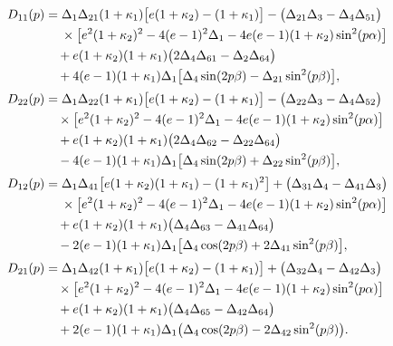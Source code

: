 \begin{subequations}
	\begin{align}
		D_{11}(p)
		&=\Delta_{1} \Delta_{21} (1+\kappa_{1})
		\bigl[e(1+\kappa_{2})-(1+\kappa_{1})\bigr]
		-\bigl(\Delta_{21}\Delta_{3}-\Delta_{4}\Delta_{51}\bigr)\notag\\
		&\quad\;\times
		\bigl[e^{2}(1+\kappa_{2})^{2}
		-4(e-1)^{2}\Delta_{1}
		-4e(e-1)(1+\kappa_{2})\sin^{2}(p\alpha)\bigr]
		\notag\\
		&\quad
		+e(1+\kappa_{2})(1+\kappa_{1})
		\bigl(2\Delta_{4}\Delta_{61}-\Delta_{2}\Delta_{64}\bigr)
		\notag\\
		&\quad
		+4(e-1)(1+\kappa_{1})\Delta_{1}
		\bigl[\Delta_{4}\sin(2p\beta)-\Delta_{21}\sin^{2}(p\beta)\bigr],
		\notag\\[2pt]
		D_{22}(p)
		&=\Delta_{1} \Delta_{22} (1+\kappa_{1})
		\bigl[e(1+\kappa_{2})-(1+\kappa_{1})\bigr]
		-\bigl(\Delta_{22}\Delta_{3}-\Delta_{4}\Delta_{52}\bigr)\notag\\
		&\quad\times
		\bigl[e^{2}(1+\kappa_{2})^{2}
		-4(e-1)^{2}\Delta_{1}
		-4e(e-1)(1+\kappa_{2})\sin^{2}(p\alpha)\bigr]
		\notag\\
		&\quad
		+e(1+\kappa_{2})(1+\kappa_{1})
		\bigl(2\Delta_{4}\Delta_{62}-\Delta_{22}\Delta_{64}\bigr)
		\notag\\
		&\quad
		-4(e-1)(1+\kappa_{1})\Delta_{1}
		\bigl[\Delta_{4}\sin(2p\beta)+\Delta_{22}\sin^{2}(p\beta)\bigr],
		\notag\\[2pt]
		D_{12}(p)
		&=\Delta_{1} \Delta_{41} 
		\bigl[e(1+\kappa_{2})(1+\kappa_{1})-(1+\kappa_{1})^{2}\bigr]
		+\bigl(\Delta_{31}\Delta_{4}-\Delta_{41}\Delta_{3}\bigr)\notag\\
		&\quad\;\times
		\bigl[e^{2}(1+\kappa_{2})^{2}
		-4(e-1)^{2}\Delta_{1}
		-4e(e-1)(1+\kappa_{2})\sin^{2}(p\alpha)\bigr]
		\notag\\
		&\quad
		+e(1+\kappa_{2})(1+\kappa_{1})
		\bigl(\Delta_{4}\Delta_{63}-\Delta_{41}\Delta_{64}\bigr)
		\notag\\
		&\quad
		-2(e-1)(1+\kappa_{1})\Delta_{1}
		\bigl[\Delta_{4}\cos(2p\beta)+2\Delta_{41}\sin^{2}(p\beta)\bigr],
		\notag\\[2pt]
		D_{21}(p)
		&=\Delta_{1} \Delta_{42} (1+\kappa_{1})
		\bigl[e(1+\kappa_{2})-(1+\kappa_{1})\bigr]
		+\bigl(\Delta_{32}\Delta_{4}-\Delta_{42}\Delta_{3}\bigr)\notag\\
		&\quad
		\times\bigl[e^{2}(1+\kappa_{2})^{2}
		-4(e-1)^{2}\Delta_{1}
		-4e(e-1)(1+\kappa_{2})\sin^{2}(p\alpha)\bigr]
		\notag\\
		&\quad
		+e(1+\kappa_{2})(1+\kappa_{1})
		\bigl(\Delta_{4}\Delta_{65}-\Delta_{42}\Delta_{64}\bigr)
		\notag\\
		&\quad
		+2(e-1)(1+\kappa_{1})\Delta_{1}
		\bigl(\Delta_{4}\cos(2p\beta)-2\Delta_{42}\sin^{2}(p\beta)\bigr).
		\notag
	\end{align}
\end{subequations}


